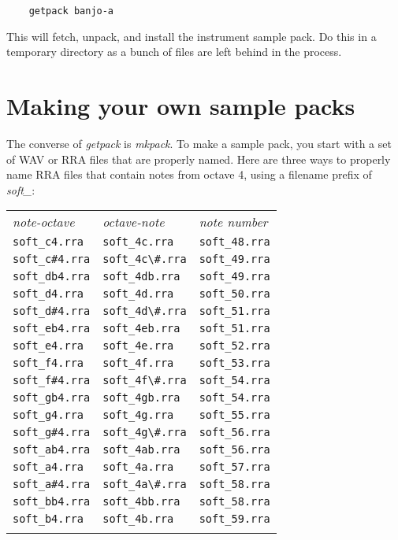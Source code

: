 \documentclass{article}
\begin{document}
\begin{verbatim}
    getpack banjo-a
\end{verbatim}
    
This will fetch, unpack, and install the instrument sample pack.
Do this in a temporary directory as a bunch of files are left
behind in the process.

\section*{Making your own sample packs}

The converse of {\it getpack} is {\it mkpack}. To make a sample pack,
you start with a set of {\sc WAV} or {\sc RRA} files that are properly named.
Here are three ways to properly name {\sc RRA} files that contain notes
from octave 4, using a filename prefix of {\it soft\_}:

\begin{center}
\begin{tabular}{lll}%
\T\toprule
    {\it note-octave}     &   {\it octave-note}     &   {\it note number}     \\
\T\midrule
\verb!soft_c4.rra!    &   \verb!soft_4c.rra!   &   \verb!soft_48.rra!   \\
\verb!soft_c#4.rra!   &   \verb!soft_4c\#.rra! &   \verb!soft_49.rra!   \\
\verb!soft_db4.rra!   &   \verb!soft_4db.rra!  &   \verb!soft_49.rra!   \\
\verb!soft_d4.rra!    &   \verb!soft_4d.rra!   &   \verb!soft_50.rra!   \\
\verb!soft_d#4.rra!   &   \verb!soft_4d\#.rra! &   \verb!soft_51.rra!   \\
\verb!soft_eb4.rra!   &   \verb!soft_4eb.rra!  &   \verb!soft_51.rra!   \\
\verb!soft_e4.rra!    &   \verb!soft_4e.rra!   &   \verb!soft_52.rra!   \\
\verb!soft_f4.rra!    &   \verb!soft_4f.rra!   &   \verb!soft_53.rra!   \\
\verb!soft_f#4.rra!   &   \verb!soft_4f\#.rra! &   \verb!soft_54.rra!   \\
\verb!soft_gb4.rra!   &   \verb!soft_4gb.rra!  &   \verb!soft_54.rra!   \\
\verb!soft_g4.rra!    &   \verb!soft_4g.rra!   &   \verb!soft_55.rra!   \\
\verb!soft_g#4.rra!   &   \verb!soft_4g\#.rra! &   \verb!soft_56.rra!   \\
\verb!soft_ab4.rra!   &   \verb!soft_4ab.rra!  &   \verb!soft_56.rra!   \\
\verb!soft_a4.rra!    &   \verb!soft_4a.rra!   &   \verb!soft_57.rra!   \\
\verb!soft_a#4.rra!   &   \verb!soft_4a\#.rra! &   \verb!soft_58.rra!   \\
\verb!soft_bb4.rra!   &   \verb!soft_4bb.rra!  &   \verb!soft_58.rra!   \\
\verb!soft_b4.rra!    &   \verb!soft_4b.rra!   &   \verb!soft_59.rra!   \\
\T\bottomrule
\end{tabular}
\end{center}
\end{document}
